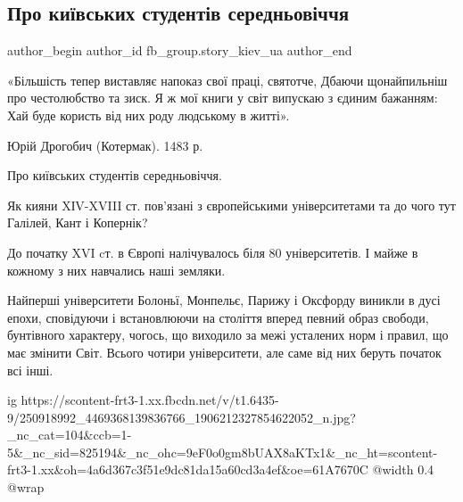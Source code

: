  
 
 
 
 
 
\subsection{Про київських студентів середньовіччя}
\label{sec:31_10_2021.fb.fb_group.story_kiev_ua.1.kievljane_universitety_srednevekovie}
 
\ifcmt
 author_begin
   author_id fb_group.story_kiev_ua
 author_end
\fi

\begin{cmtfront}

«Більшість тепер виставляє напоказ свої праці, святотче,
Дбаючи щонайпильніш про честолюбство та зиск.
Я ж мої книги у світ випускаю з єдиним бажанням:
Хай буде користь від них роду людському в житті». 

Юрій Дрогобич (Котермак). 1483 р.
\end{cmtfront}

Про київських студентів середньовіччя.

Як кияни XІV-XVIII ст. пов’язані з європейськими університетами та до чого тут
Галілей, Кант і Копернік?

До початку XVI cт. в Європі налічувалось біля 80 університетів. І майже в
кожному з них навчались наші земляки. 

Найперші університети Болоньї, Монпельє, Парижу і Оксфорду виникли в дусі
епохи, сповідуючи і встановлюючи на століття вперед певний образ свободи,
бунтівного характеру, чогось, що виходило за межі усталених норм і правил, що
має змінити Світ. Всього чотири університети, але саме від них беруть початок
всі інші.

\ifcmt
  ig https://scontent-frt3-1.xx.fbcdn.net/v/t1.6435-9/250918992_4469368139836766_1906212327854622052_n.jpg?_nc_cat=104&ccb=1-5&_nc_sid=825194&_nc_ohc=9eF0o0gm8bUAX8aKTx1&_nc_ht=scontent-frt3-1.xx&oh=4a6d367c3f51e9dc81da15a60cd3a4ef&oe=61A7670C
  @width 0.4
  @wrap 
\fi

